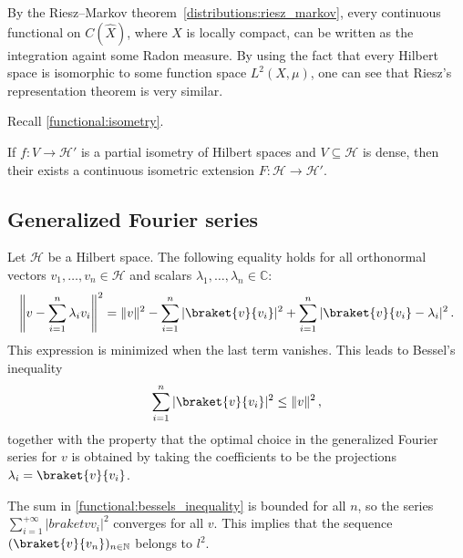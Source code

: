     \begin{remark}
        By the Riesz--Markov theorem~\ref{distributions:riesz_markov}, every continuous functional on $C(\widehat{X})$, where $X$ is locally compact, can be written as the integration againt some Radon measure. By using the fact that every Hilbert space is isomorphic to some function space $L^2(X,\mu)$, one can see that Riesz's representation theorem is very similar.
    \end{remark}

    Recall \cref{functional:isometry}.
    \begin{property}[Isometries]\label{functional:isometry_extension}
        If $f:V\rightarrow\mathcal{H}'$ is a partial isometry of Hilbert spaces and $V\subseteq\mathcal{H}$ is dense, then their exists a continuous isometric extension $F:\mathcal{H}\rightarrow\mathcal{H}'$.
    \end{property}

\subsection{Generalized Fourier series}

    \begin{property}
        Let $\mathcal{H}$ be a Hilbert space. The following equality holds for all orthonormal vectors $v_1,\ldots,v_n\in\mathcal{H}$ and scalars $\lambda_1,\ldots,\lambda_n\in\mathbb{C}$:
        \begin{gather}
            \left\|v - \sum_{i=1}^n\lambda_iv_i\right\|^2 = \|v\|^2 - \sum_{i=1}^n|\braket{v}{v_i}|^2 + \sum_{i=1}^n|\braket{v}{v_i} - \lambda_i|^2\,.
        \end{gather}
        This expression is minimized when the last term vanishes. This leads to Bessel's inequality
        \begin{gather}
            \label{functional:bessels_inequality}
            \sum_{i=1}^n|\braket{v}{v_i}|^2\leq\|v\|^2\,,
        \end{gather}
        together with the property that the optimal choice in the generalized Fourier series for $v$ is obtained by taking the coefficients to be the projections $\lambda_i=\braket{v}{v_i}$.
    \end{property}
    \begin{result}
        The sum in \cref{functional:bessels_inequality} is bounded for all $n$, so the series $\sum_{i=1}^{+\infty}|braket{v}{v_i}|^2$ converges for all $v$. This implies that the sequence $(\braket{v}{v_n})_{n\in\mathbb{N}}$ belongs to $l^2$.
    \end{result}

